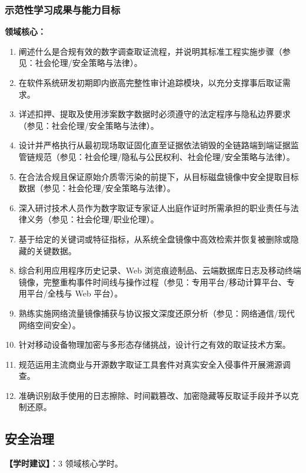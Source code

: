 \subsubsection{示范性学习成果与能力目标}
\textbf{领域核心：}
\begin{enumerate}\setlength{\itemsep}{0pt}\setlength{\parskip}{0pt}
    \item 阐述什么是合规有效的数字调查取证流程，并说明其标准工程实施步骤（参见：社会伦理/安全策略与法律）。
    \item 在软件系统研发初期即内嵌高完整性审计追踪模块，以充分支撑事后取证需求。
    \item 详述扣押、提取及使用涉案数字数据时必须遵守的法定程序与隐私边界要求（参见：社会伦理/安全策略与法律）。
    \item 设计并严格执行从最初现场取证固化直至证据依法销毁的全链路端到端证据监管链规范（参见：社会伦理/隐私与公民权利、社会伦理/安全策略与法律）。
    \item 在合法合规且保证原始介质零污染的前提下，从目标磁盘镜像中安全提取目标数据（参见：社会伦理/安全策略与法律）。
    \item 深入研讨技术人员作为数字取证专家证人出庭作证时所需承担的职业责任与法律义务（参见：社会伦理/职业伦理）。
    \item 基于给定的关键词或特征指标，从系统全盘镜像中高效检索并恢复被删除或隐藏的关键数据。
    \item 综合利用应用程序历史记录、Web 浏览痕迹制品、云端数据库日志及移动终端镜像，完整重构事件时间线与操作过程（参见：专用平台/移动计算平台、专用平台/全栈与 Web 平台）。
    \item 熟练实施网络流量镜像捕获与协议报文深度还原分析（参见：网络通信/现代网络空间安全）。
    \item 针对移动设备物理加密与多形态存储挑战，设计行之有效的取证技术方案。
    \item 规范运用主流商业与开源数字取证工具套件对真实安全入侵事件开展溯源调查。
    \item 准确识别敌手使用的日志擦除、时间戳篡改、加密隐藏等反取证手段并予以克制还原。
\end{enumerate}

\subsection{安全治理}
\textbf{【学时建议】}：3 领域核心学时。

